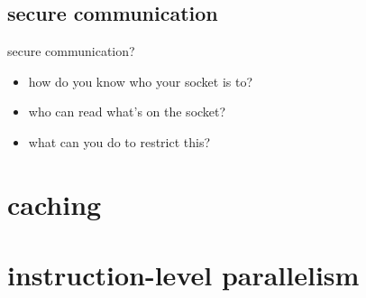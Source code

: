 

\subsection{secure communication}

\begin{frame}{secure communication?}
    \begin{itemize}
    \item how do you know who your socket is to?
    \item who can read what's on the socket?
    \item what can you do to restrict this?
    \end{itemize}
\end{frame}

\section{caching}




\section{instruction-level parallelism}


